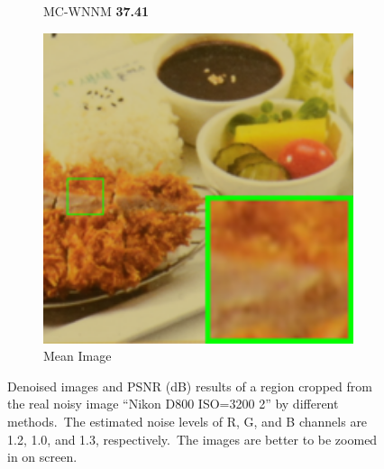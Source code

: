 \begin{figure}
\begin{subfigure}[t]{0.19\textwidth}
		\caption{MC-WNNM \textbf{37.41}}
    \end{subfigure}
    \hfill
    \begin{subfigure}[t]{0.19\textwidth}
        \centering
        \includegraphics[width=1\textwidth]{images/mcwnnm/cc/resize_br_d800_iso3200_2.png}
		\caption{Mean Image}
    \end{subfigure}
    \caption{Denoised images and PSNR (dB) results of a region cropped from the real noisy image ``Nikon D800 ISO=3200 2'' \cite{crosschannel2016} by different methods.\ The estimated noise levels of R, G, and B channels are 1.2, 1.0, and 1.3, respectively.\ The images are better to be zoomed in on screen.}
    \label{fig4-16}
\end{figure}



